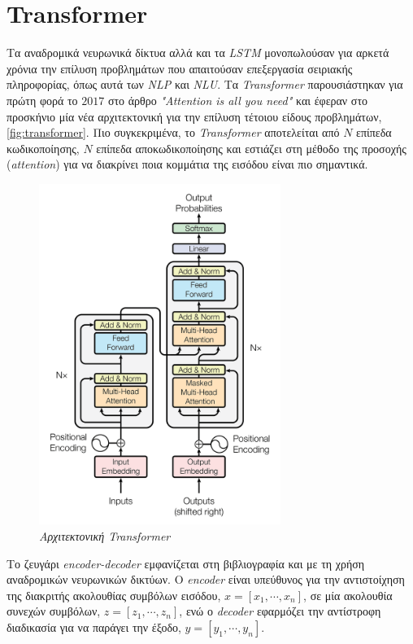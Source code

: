 \section{Transformer}
Τα αναδρομικά νευρωνικά δίκτυα αλλά και τα \emph{LSTM} μονοπωλούσαν για αρκετά χρόνια την επίλυση προβλημάτων που απαιτούσαν επεξεργασία σειριακής πληροφορίας, όπως αυτά των \emph{NLP} και \emph{NLU}. Τα \emph{Transformer} παρουσιάστηκαν για πρώτη φορά το $2017$ στο άρθρο \emph{"Attention is all you need"} \cite{attention} και έφεραν στο προσκήνιο μία νέα αρχιτεκτονική για την επίλυση τέτοιου είδους προβλημάτων, \autoref{fig:transformer}. Πιο συγκεκριμένα, το \emph{Transformer} αποτελείται από $N$ επίπεδα κωδικοποίησης, $N$ επίπεδα αποκωδικοποίησης και εστιάζει στη μέθοδο της προσοχής (\emph{attention}) για να διακρίνει ποια κομμάτια της εισόδου είναι πιο σημαντικά.

\begin{figure}[!ht]
  \centering
  \captionsetup{justification=centering}
  \includegraphics[width=0.7\textwidth]{images/chapter2/transformer.png}
  \caption{\emph{Αρχιτεκτονική Transformer}\\}
  \label{fig:transformer}
\end{figure}
\noindent


Το ζευγάρι \emph{encoder-decoder} εμφανίζεται στη βιβλιογραφία και με τη χρήση αναδρομικών νευρωνικών δικτύων. Ο \emph{encoder} είναι υπεύθυνος για την αντιστοίχηση της διακριτής ακολουθίας συμβόλων εισόδου, $x= [x_1, \cdots, x_n]$, σε μία ακολουθία συνεχών συμβόλων, $z = [z_1, \cdots, z_n]$, ενώ ο \emph{decoder} εφαρμόζει την αντίστροφη διαδικασία για να παράγει την έξοδο, $y = [y_1, \cdots, y_n]$.

